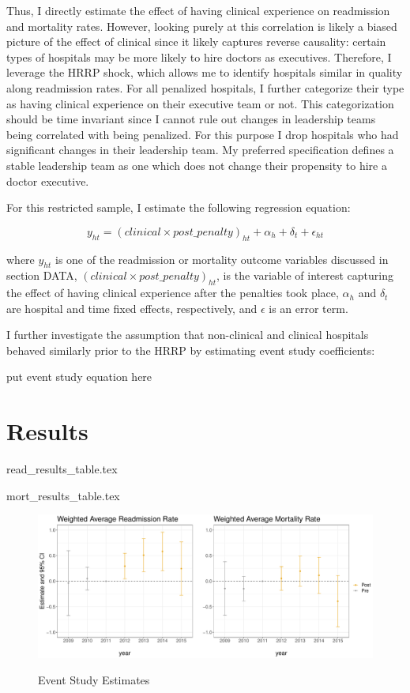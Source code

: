\documentclass[12pt]{article}
\begin{document}
    Thus, I directly estimate the effect of having clinical experience on readmission and mortality rates. However, looking purely at this correlation is likely a biased picture of the effect of clinical since it likely captures reverse causality: certain types of hospitals may be more likely to hire doctors as executives. Therefore, I leverage the HRRP shock, which allows me to identify hospitals similar in quality along readmission rates. For all penalized hospitals, I further categorize their type as having clinical experience on their executive team or not. This categorization should be time invariant since I cannot rule out changes in leadership teams being correlated with being penalized. For this purpose I drop hospitals who had significant changes in their leadership team. My preferred specification defines a stable leadership team as one which does not change their propensity to hire a doctor executive. 

    For this restricted sample, I estimate the following regression equation:

    $$y_{ht} = (clinical \times post\_penalty)_{ht} + \alpha_{h} + \delta_t + \epsilon_{ht}$$

    \noindent where $y_{ht}$ is one of the readmission or mortality outcome variables discussed in section DATA, $(clinical \times post\_penalty)_{ht}$, is the variable of interest capturing the effect of having clinical experience after the penalties took place, $\alpha_h$ and $\delta_t$ are hospital and time fixed effects, respectively, and $\epsilon$ is an error term. 

    I further investigate the assumption that non-clinical and clinical hospitals behaved similarly prior to the HRRP by estimating event study coefficients:

    put event study equation here

    \section{Results}

    {read_results_table.tex}

    {mort_results_table.tex}

    \begin{figure}
        \centering
        \caption{Event Study Estimates}
        \includegraphics[scale=.5]{Objects/wa_eventstudy.pdf}
        \label{fig:wa_eventstudy}
    \end{figure}
\end{document}
